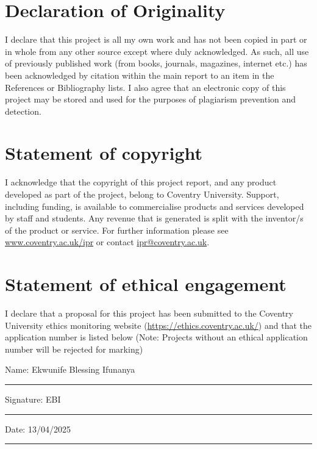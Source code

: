 \documentclass[12pt,oneside]{book}
\begin{document}
\newpage
\section*{Declaration of Originality}

I declare that this project is all my own work and has not been copied in part or in whole from any other source except where duly acknowledged. As such, all use of previously published work (from books, journals, magazines, internet etc.) has been acknowledged by citation within the main report to an item in the References or Bibliography lists. I also agree that an electronic copy of this project may be stored and used for the purposes of plagiarism prevention and detection.

\bigskip

\section*{Statement of copyright}
I acknowledge that the copyright of this project report, and any product developed as part of the project, belong to Coventry University. Support, including funding, is available to commercialise products and services developed by staff and students. Any revenue that is generated is split with the inventor/s of the product or service. For further information please see \href{https://www.coventry.ac.uk/ipr}{www.coventry.ac.uk/ipr} or contact 
\href{mailto:ipr@coventry.ac.uk}{ipr@coventry.ac.uk}.

\bigskip

\section*{Statement of ethical engagement}
I declare that a proposal for this project has been submitted to the Coventry University ethics monitoring website (\href{https://ethics.coventry.ac.uk/}{https://ethics.coventry.ac.uk/}) and that the application number is listed below (Note: Projects without an ethical application number will be rejected for marking)

\bigskip
\noindent Name: Ekwunife Blessing Ifunanya\\[1mm]
\rule[1em]{25em}{0.5pt}

\noindent Signature: EBI\\[1mm]
\rule[1em]{25em}{0.5pt}

\noindent Date: 13/04/2025\\[1mm]
\rule[1em]{25em}{0.5pt}
\end{document}
